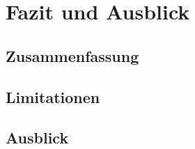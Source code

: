 \chapter{Fazit und Ausblick}\label{chap:fazit}

\section{Zusammenfassung}\label{sec:zusammenfassung}

\section{Limitationen}\label{sec:limitationen}

\section{Ausblick}\label{sec:ausblick}
